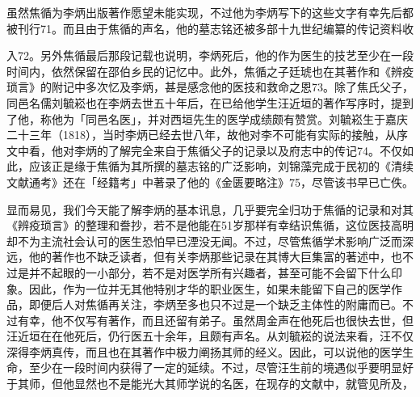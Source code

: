 虽然焦循为李炳出版著作愿望未能实现，不过他为李炳写下的这些文字有幸先后都被刊行71。而且由于焦循的声名，他的墓志铭还被多部十九世纪编纂的传记资料收

\vfill
\begin{BookNotes}
\end{BookNotes}

\noindent 入72。另外焦循最后那段记载也说明，李炳死后，他的作为医生的技艺至少在一段时间内，依然保留在邵伯乡民的记忆中。此外，焦循之子廷琥也在其著作和《辨疫琐言》的附记中多次忆及李炳，甚是感念他的医技和救命之恩73。除了焦氏父子，同邑名儒刘毓崧也在李炳去世五十年后，在已给他学生汪近垣的著作写序时，提到了他，称他为「同邑名医」，并对西垣先生的医学成绩颇有赞赏。刘毓崧生于嘉庆二十三年（1818），当时李炳已经去世八年，故他对李不可能有实际的接触，从序文中看，他对李炳的了解完全来自于焦循父子的记录以及府志中的传记74。不仅如此，应该正是缘于焦循为其所撰的墓志铭的广泛影响，刘锦藻完成于民初的《清续文献通考》还在「经籍考」中著录了他的《金匮要略注》75，尽管该书早已亡佚。

显而易见，我们今天能了解李炳的基本讯息，几乎要完全归功于焦循的记录和对其《辨疫琐言》的整理和誊抄，若不是他能在51岁那样有幸结识焦循，这位医技高明却不为主流社会认可的医生恐怕早已湮没无闻。不过，尽管焦循学术影响广泛而深远，他的著作也不缺乏读者，但有关李炳那些记录在其博大巨集富的著述中，也不过是并不起眼的一小部分，若不是对医学所有兴趣者，甚至可能不会留下什么印象。因此，作为一位并无其他特别才华的职业医生，如果未能留下自己的医学作品，即便后人对焦循再关注，李炳至多也只不过是一个缺乏主体性的附庸而已。不过有幸，他不仅写有著作，而且还留有弟子。虽然周金声在他死后也很快去世，但汪近垣在在他死后，仍行医五十余年，且颇有声名。从刘毓崧的说法来看，汪不仅深得李炳真传，而且也在其著作中极力阐扬其师的经义。因此，可以说他的医学生命，至少在一段时间内获得了一定的延续。不过，尽管汪生前的境遇似乎要明显好于其师，但他显然也不是能光大其师学说的名医，在现存的文献中，就管见所及，

\vfill
\begin{BookNotes}
\end{BookNotes}

